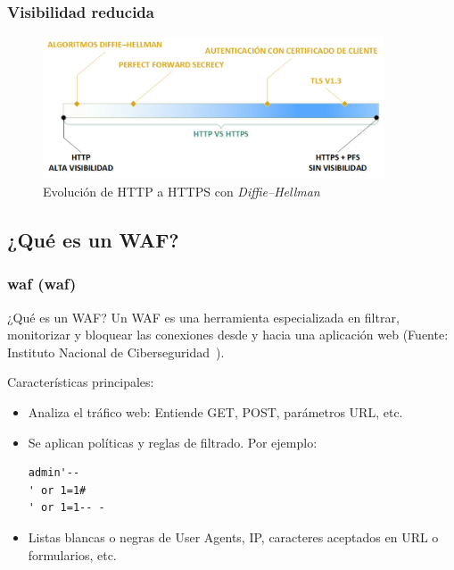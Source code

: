 \begin{frame}[shrink=20]
  \frametitle{Visibilidad reducida}
    \begin{figure}[c]
			\includegraphics[width=0.9\textwidth]{fig/TLS_Visibility}
      \caption{\small{Evolución de HTTP a HTTPS con {\em Diffie–Hellman}}}
		\end{figure}
\end{frame}

\subsection{¿Qué es un WAF?}
\begin{frame}[shrink=20,fragile]
  \frametitle{\acrlong{waf} (\acrshort{waf})}
  \begin{exampleblock}{¿Qué es un WAF?}
    Un WAF es una herramienta especializada en filtrar, monitorizar y bloquear las conexiones desde y hacia una aplicación web (Fuente: Instituto Nacional de Ciberseguridad~\cite{incibewaf}).
  \end{exampleblock}
  Características principales:
  \begin{itemize}
    \item Analiza el tráfico web: Entiende GET, POST, parámetros URL, etc.
    \item Se aplican políticas y reglas de filtrado. Por ejemplo:
        \begin{lstlisting}
admin'--
' or 1=1#
' or 1=1-- -
        \end{lstlisting}
    \item Listas blancas o negras de User Agents, IP, caracteres aceptados en URL o formularios, etc.
  \end{itemize}
\end{frame}

